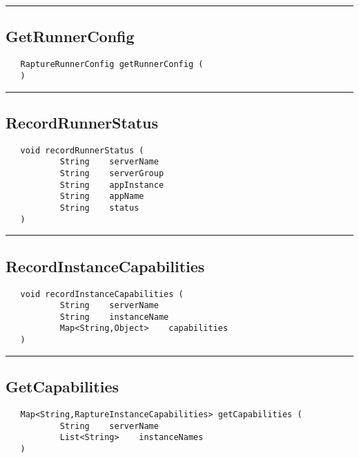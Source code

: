 \rule{15cm}{2pt}
\subsection{GetRunnerConfig}
\label{Api:GetRunnerConfig}
\begin{verbatim}
   RaptureRunnerConfig getRunnerConfig (
   )
\end{verbatim}



\rule{15cm}{2pt}
\subsection{RecordRunnerStatus}
\label{Api:RecordRunnerStatus}
\begin{verbatim}
   void recordRunnerStatus (
           String    serverName
           String    serverGroup
           String    appInstance
           String    appName
           String    status
   )
\end{verbatim}



\rule{15cm}{2pt}
\subsection{RecordInstanceCapabilities}
\label{Api:RecordInstanceCapabilities}
\begin{verbatim}
   void recordInstanceCapabilities (
           String    serverName
           String    instanceName
           Map<String,Object>    capabilities
   )
\end{verbatim}



\rule{15cm}{2pt}
\subsection{GetCapabilities}
\label{Api:GetCapabilities}
\begin{verbatim}
   Map<String,RaptureInstanceCapabilities> getCapabilities (
           String    serverName
           List<String>    instanceNames
   )
\end{verbatim}



